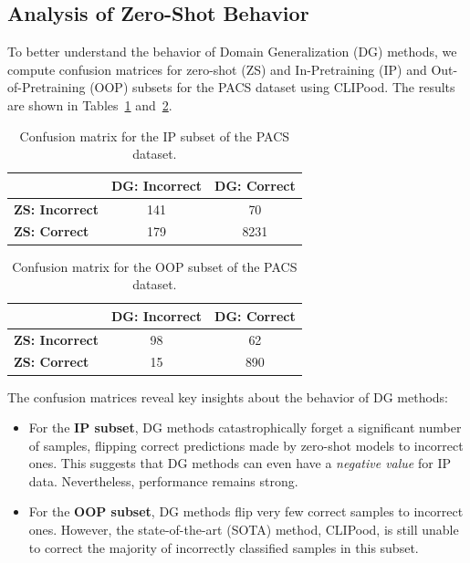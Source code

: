 \documentclass{article} %
\begin{document}
\subsection{Analysis of Zero-Shot Behavior}
\label{sec:zs_analysis}


To better understand the behavior of Domain Generalization (DG) methods, we compute confusion matrices for zero-shot (ZS) and In-Pretraining (IP) and Out-of-Pretraining (OOP) subsets for the PACS dataset using CLIPood. The results are shown in Tables~\ref{tab:confusion_ip} and~\ref{tab:confusion_oop}.

\begin{table}[h]
    \centering
    \caption{Confusion matrix for the IP subset of the PACS dataset.}
    \begin{tabular}{l|c|c}
        \hline
        & \textbf{DG: Incorrect} & \textbf{DG: Correct} \\ \hline
        \textbf{ZS: Incorrect} & 141 & 70 \\ 
        \textbf{ZS: Correct} & 179 & 8231 \\ \hline
    \end{tabular}
    
    \label{tab:confusion_ip}
\end{table}

\begin{table}[h]
    \centering
    \caption{Confusion matrix for the OOP subset of the PACS dataset.}
    \begin{tabular}{l|c|c}
        \hline
        & \textbf{DG: Incorrect} & \textbf{DG: Correct} \\ \hline
        \textbf{ZS: Incorrect} & 98 & 62 \\ 
        \textbf{ZS: Correct} & 15 & 890 \\ \hline
    \end{tabular}

    \label{tab:confusion_oop}
\end{table}

The confusion matrices reveal key insights about the behavior of DG methods:
\begin{itemize}
    \item For the \textbf{IP subset}, DG methods catastrophically forget a significant number of samples, flipping correct predictions made by zero-shot models to incorrect ones. This suggests that DG methods can even have a \textit{negative value} for IP data. Nevertheless, performance remains strong. 
    \item For the \textbf{OOP subset}, DG methods flip very few correct samples to incorrect ones. However, the state-of-the-art (SOTA) method, CLIPood, is still unable to correct the majority of incorrectly classified samples in this subset.
\end{itemize}
\end{document}
